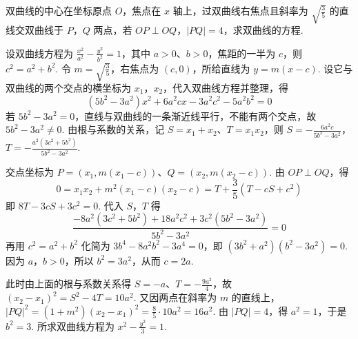 \documentclass[UTF8,a4paper,oneside,11pt]{ctexbook}
\begin{document}
\begin{problem}
双曲线的中心在坐标原点 \(O\)，焦点在 \(x\) 轴上，过双曲线右焦点且斜率为 \(\sqrt{\frac{3}{5}}\) 的直线交双曲线于 \(P\)，\(Q\) 两点，若 \(OP\perp OQ\)，\(|PQ|=4\)，求双曲线的方程.

\begin{solution}
设双曲线方程为 \(\frac{x^2}{a^2}-\frac{y^2}{b^2}=1\)，其中 \(a>0\)、\(b>0\)，焦距的一半为 \(c\)，则 \(c^2=a^2+b^2\). 令 \(m=\sqrt{\frac35}\)，右焦点为 \((c,0)\)，所给直线为 \(y=m(x-c)\). 设它与双曲线的两个交点的横坐标为 \(x_1\)，\(x_2\)，代入双曲线方程并整理，得
\[
\left(5b^2-3a^2\right)x^2+6a^2cx-3a^2c^2-5a^2b^2=0
\]
若 \(5b^2-3a^2=0\)，直线与双曲线的一条渐近线平行，不能有两个交点，故 \(5b^2-3a^2\ne0\). 由根与系数的关系，记 \(S=x_1+x_2\)、\(T=x_1x_2\)，则
\(S=-\frac{6a^2c}{5b^2-3a^2}\)，\(T=-\frac{a^2(3c^2+5b^2)}{5b^2-3a^2}\).

交点坐标为 \(P=(x_1,m(x_1-c))\)、\(Q=(x_2,m(x_2-c))\). 由 \(OP\perp OQ\)，得
\[
0=x_1x_2+m^2(x_1-c)(x_2-c)=T+\frac35(T-cS+c^2)
\]
即 \(8T-3cS+3c^2=0\). 代入 \(S\)，\(T\) 得
\[
\frac{-8a^2(3c^2+5b^2)+18a^2c^2+3c^2(5b^2-3a^2)}{5b^2-3a^2}=0
\]
再用 \(c^2=a^2+b^2\) 化简为 \(3b^4-8a^2b^2-3a^4=0\)，即 \((3b^2+a^2)(b^2-3a^2)=0\). 因为 \(a\)，\(b>0\)，所以 \(b^2=3a^2\)，从而 \(c=2a\).

此时由上面的根与系数关系得 \(S=-a\)、\(T=-\frac{9a^2}{4}\)，故 \((x_2-x_1)^2=S^2-4T=10a^2\). 又因两点在斜率为 \(m\) 的直线上，\(|PQ|^2=(1+m^2)(x_2-x_1)^2=\frac85\cdot10a^2=16a^2\). 由 \(|PQ|=4\)，得 \(a^2=1\)，于是 \(b^2=3\). 所求双曲线方程为 \(\boxed{x^2-\frac{y^2}{3}=1}\).
\end{solution}
\end{problem}

\end{document}
